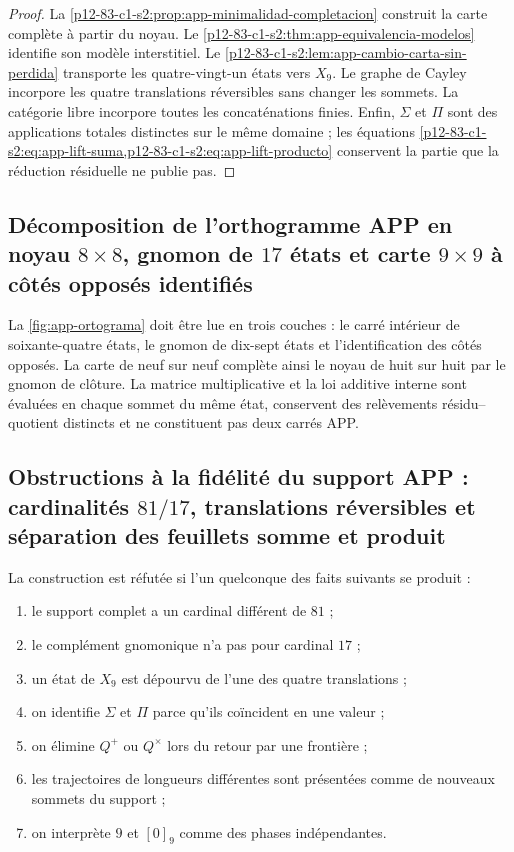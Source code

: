 \begin{proof}
La \cref{p12-83-c1-s2:prop:app-minimalidad-completacion} construit la carte complète à
partir du noyau. Le \cref{p12-83-c1-s2:thm:app-equivalencia-modelos} identifie son
modèle interstitiel. Le \cref{p12-83-c1-s2:lem:app-cambio-carta-sin-perdida} transporte
les quatre-vingt-un états vers \(X_9\). Le graphe de Cayley incorpore les quatre
translations réversibles sans changer les sommets. La catégorie libre
incorpore toutes les concaténations finies. Enfin, \(\Sigma\) et
\(\Pi\) sont des applications totales distinctes sur le même domaine ; les
équations \cref{p12-83-c1-s2:eq:app-lift-suma,p12-83-c1-s2:eq:app-lift-producto} conservent la partie
que la réduction résiduelle ne publie pas.
\end{proof}

\subsection{Décomposition de l’orthogramme APP en noyau \(8\times8\), gnomon de \(17\) états et carte \(9\times9\) à côtés opposés identifiés}

La \cref{fig:app-ortograma} doit être lue en trois couches : le carré intérieur
de soixante-quatre états, le gnomon de dix-sept états et
l’identification des côtés opposés. La carte de neuf sur neuf complète ainsi le
noyau de huit sur huit par le gnomon de clôture. La matrice
multiplicative et la loi additive interne sont évaluées en chaque sommet du même
état, conservent des relèvements résidu--quotient distincts et ne constituent pas
deux carrés APP.

\subsection{Obstructions à la fidélité du support APP : cardinalités \(81/17\), translations réversibles et séparation des feuillets somme et produit}

\begin{criterion}
La construction est réfutée si l’un quelconque des faits
suivants se produit :
\begin{enumerate}
 \item le support complet a un cardinal différent de \(81\) ;
 \item le complément gnomonique n’a pas pour cardinal \(17\) ;
 \item un état de \(X_9\) est dépourvu de l’une des quatre translations ;
 \item on identifie \(\Sigma\) et \(\Pi\) parce qu’ils coïncident en une valeur ;
 \item on élimine \(Q^+\) ou \(Q^\times\) lors du retour par une frontière ;
 \item les trajectoires de longueurs différentes sont présentées comme de nouveaux
       sommets du support ;
 \item on interprète \(9\) et \([0]_9\) comme des phases indépendantes.
\end{enumerate}
\end{criterion}

